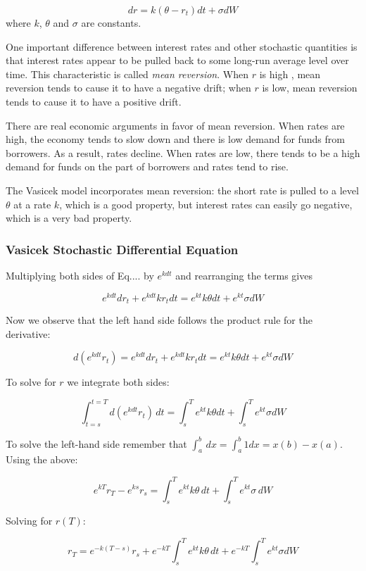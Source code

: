 \[dr = k(\theta - r_t)dt + \sigma dW\]
where \(k\), \(\theta\) and \(\sigma\) are constants.

One important difference between interest rates and other stochastic
quantities is that interest rates appear to be pulled back to some
long-run average level over time. This characteristic is called
\emph{mean reversion}. When \(r\) is high , mean
reversion tends to cause it to have a negative drift; when \(r\) is low,
mean reversion tends to cause it to have a positive drift.

There are real economic arguments in favor of mean reversion. When rates
are high, the economy tends to slow down and there is low demand for
funds from borrowers. As a result, rates decline. When rates are low,
there tends to be a high demand for funds on the part of borrowers and
rates tend to rise.

The Vasicek model incorporates mean reversion: the
short rate is pulled to a level \(\theta\) at a rate \(k\), which is a good
property, but interest rates can easily go negative, which is a very bad
property.

\subsubsection{Vasicek Stochastic Differential Equation}
\label{vasicek-stochastic-differential-equation}

Multiplying both sides of Eq.... by \(e^{kdt}\) and rearranging
the terms gives

\[e^{kdt}dr_t + e^{kdt}kr_t dt = e^{kt}k\theta dt + e^{kt}\sigma dW\]

Now we observe that the left hand side follows the product rule for the
derivative:

\[d(e^{kdt}r_t) = e^{kdt}dr_t + e^{kdt}kr_t dt= e^{kt}k\theta dt + e^{kt}\sigma dW\]

To solve for \(r\) we integrate both sides:

\[\int^{t=T}_{t=s} d(e^{kdt}r_t)\,dt = \int^T_s e^{kt}k\theta dt +\int^T_s e^{kt}\sigma dW\]

To solve the left-hand side remember that
\(\int^b_a\,dx = \int^b_a 1 dx= x(b)-x(a)\). Using the above:

\[e^{kT}r_T - e^{ks}r_s = \int^T_s e^{kt}k\theta\,dt +\int^T_s e^{kt}\sigma\,dW\]

Solving for \(r(T)\):

\[r_T=e^{-k(T-s)}r_s+ e^{-kT}\int^T_s e^{kt}k\theta\,dt +e^{-kT}\int^T_s e^{kt}\sigma dW\]

